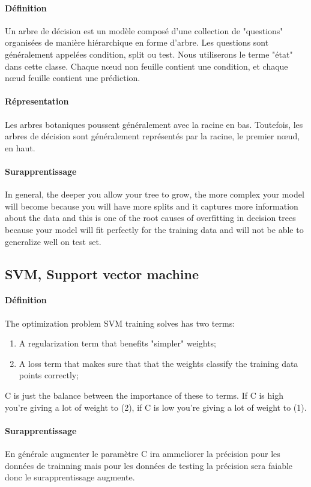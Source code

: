 \documentclass{article}
\begin{document}
\paragraph{Définition}Un arbre de décision est un modèle composé d'une collection de "questions" organisées de manière hiérarchique en forme d'arbre. Les questions sont généralement appelées condition, split ou test. Nous utiliserons le terme "état" dans cette classe. Chaque nœud non feuille contient une condition, et chaque nœud feuille contient une prédiction.

\paragraph{Répresentation}Les arbres botaniques poussent généralement avec la racine en bas. Toutefois, les arbres de décision sont généralement représentés par la racine, le premier nœud, en haut.

\paragraph{Surapprentissage}In general, the deeper you allow your tree to grow, the more complex your model will become because you will have more splits and it captures more information about the data and this is one of the root causes of overfitting in decision trees because your model will fit perfectly for the training data and will not be able to generalize well on test set.

\subsection{SVM, Support vector machine}
\paragraph{Définition}The optimization problem SVM training solves has two terms:
\begin{enumerate}[noitemsep]
    \item A regularization term that benefits "simpler" weights;
    \item A loss term that makes sure that that the weights classify the training data points correctly;
\end{enumerate}
C is just the balance between the importance of these to terms. If C is high you're giving a lot of weight to (2), if C is low you're giving a lot of weight to (1).

\paragraph{Surapprentissage}En générale augmenter le paramètre C ira ammeliorer la précision pour les données de trainning mais pour les données de testing la précision sera faiable donc le surapprentissage augmente.
\end{document}
